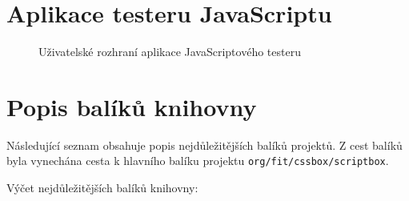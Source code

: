 \chapter{Aplikace testeru JavaScriptu}
\label{Annex.JavaScriptTester}

\begin{figure}[H]
  \begin{center}
    \caption{Uživatelské rozhraní aplikace JavaScriptového testeru}
    \label{Figure.JavaScriptTester}
  \end{center}
\end{figure}

\chapter{Popis balíků knihovny}
\label{Annex.packageDescription}

Následující seznam obsahuje popis nejdůležitějších balíků projektů. Z cest balíků byla vynechána 
cesta k hlavního balíku projektu \texttt{org/fit/cssbox/scriptbox}.

\bigskip

\noindent Výčet nejdůležitějších balíků knihovny:


